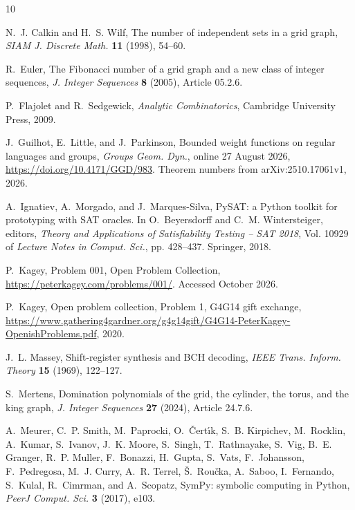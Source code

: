 \documentclass[12pt]{article}
\theoremstyle{plain}
\theoremstyle{definition}
\theoremstyle{remark}
\begin{document}
\begin{thebibliography}{10}

N.~J. Calkin and H.~S. Wilf, The number of independent sets in a grid graph,
  {\em SIAM J. Discrete Math.} {\bf 11} (1998), 54--60.

R.~Euler, The {F}ibonacci number of a grid graph and a new class of integer
  sequences, {\em J. Integer Sequences} {\bf 8} (2005), Article 05.2.6.

P.~Flajolet and R.~Sedgewick, {\em Analytic Combinatorics}, Cambridge
  University Press, 2009.

J.~Guilhot, E.~Little, and J.~Parkinson, Bounded weight functions on regular
  languages and groups, \emph{Groups Geom. Dyn.}, online 27 August 2026,
  \url{https://doi.org/10.4171/GGD/983}. Theorem numbers from
  arXiv:2510.17061v1, 2026.

A.~Ignatiev, A.~Morgado, and J.~Marques-Silva, {PySAT}: a {P}ython toolkit for
  prototyping with {SAT} oracles.
\newblock In O.~Beyersdorff and C.~M. Wintersteiger, editors, {\em Theory and
  Applications of Satisfiability Testing -- {SAT} 2018}, Vol. 10929 of {\em
  Lecture Notes in Comput. Sci.}, pp.  428--437. Springer, 2018.

P.~Kagey, Problem 001, {O}pen {P}roblem {C}ollection,
  \url{https://peterkagey.com/problems/001/}.
\newblock Accessed October 2026.

P.~Kagey, Open problem collection, {P}roblem 1, G4G14 gift exchange,
  \url{https://www.gathering4gardner.org/g4g14gift/G4G14-PeterKagey-OpenishProblems.pdf},
  2020.

J.~L. Massey, Shift-register synthesis and {BCH} decoding, {\em IEEE Trans.
  Inform. Theory} {\bf 15} (1969), 122--127.

S.~Mertens, Domination polynomials of the grid, the cylinder, the torus, and
  the king graph, {\em J. Integer Sequences} {\bf 27} (2024), Article 24.7.6.

A.~Meurer, C.~P. Smith, M.~Paprocki, O.~{\v{C}}ert{\'{\i}}k, S.~B. Kirpichev,
  M.~Rocklin, A.~Kumar, S.~Ivanov, J.~K. Moore, S.~Singh, T.~Rathnayake,
  S.~Vig, B.~E. Granger, R.~P. Muller, F.~Bonazzi, H.~Gupta, S.~Vats,
  F.~Johansson, F.~Pedregosa, M.~J. Curry, A.~R. Terrel, {\v{S}}.~Rou{\v{c}}ka,
  A.~Saboo, I.~Fernando, S.~Kulal, R.~Cimrman, and A.~Scopatz, {SymPy}:
  symbolic computing in {P}ython, {\em PeerJ Comput. Sci.} {\bf 3} (2017),
  e103.


\end{thebibliography}
\end{document}
